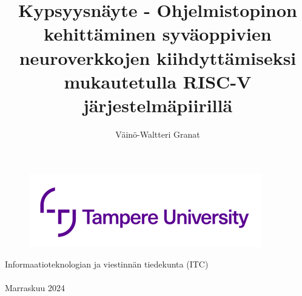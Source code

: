 \documentclass[12pt,a4paper,finnish
]{tunithesis}
\author{Väinö-Waltteri Granat}
\title{Kypsyysnäyte - Ohjelmistopinon kehittäminen syväoppivien neuroverkkojen kiihdyttämiseksi mukautetulla RISC-V järjestelmäpiirillä} %
\begin{document}
\makeatletter

\thispagestyle{empty}
\vspace*{-.5cm}\noindent

\begin{figure}
    \vspace{-1.3cm}
    \advance\leftskip-2.5cm
    \noindent\includegraphics{../thesis/img/tunilogo.png}
\end{figure}
 
\vspace{2.5cm}
\begin{flushright}
\noindent\textsf{\LARGE{\@author}}

\noindent\vspace{0.5cm}

\noindent\Huge{\textsf{\textbf{\textcolor{tunipurple}{\@title}}}}
\end{flushright}
\vspace{8.7cm} %

\begin{flushright}  
    \begin{spacing}{1.0}
      \textsf{Informaatioteknologian ja viestinnän tiedekunta (ITC)\\
      \@thesistype\\
      Marraskuu 2024}
    \end{spacing}
\end{flushright}

\if@twoside
\clearpage
\fi

%



\end{document}
